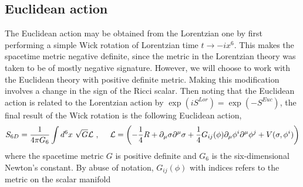 \documentclass[12pt]{article}
\begin{document}
\subsection{Euclidean action}
The Euclidean action may be obtained from the Lorentzian one by first performing a simple Wick rotation of Lorentzian time $t\rightarrow-ix^6$. This makes the spacetime metric negative definite, since the metric in the Lorentzian theory was taken to be of mostly negative signature. However, we will choose to work with the Euclidean theory with positive definite metric. Making this modification involves a change in the sign of the Ricci scalar. Then noting that the Euclidean action is related to the Lorentzian action by $\exp \left(i S^{Lor}\right)=\exp \left(-S^{Euc}\right)$, the final result of the Wick rotation is the following Euclidean action,
\begin{eqnarray}
S_{6D}=\frac{1}{4\pi G_6}\int d^6x ~\sqrt{G} {\cal L} ~,~~~~ {\cal L}= \left(-{1 \over 4} R +\partial_\mu\sigma\partial^\mu\sigma+{1\over 4}G_{ij}(\phi)\partial_\mu \phi^i \partial^\mu \phi^j + V(\sigma,\phi^i)\right)
\end{eqnarray}
where the spacetime metric $G$ is positive definite and $G_6$ is the six-dimensional Newton's constant. By abuse of notation, $G_{ij}(\phi)$ with indices refers to the metric on the scalar manifold
\end{document}
